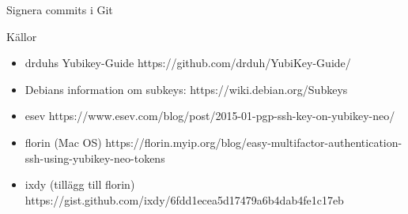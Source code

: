 \documentclass{beamer}
\begin{document}
\begin{frame}[fragile]{Signera commits i Git}
\end{frame}

\begin{frame}{Källor}
  \begin{itemize}
    \item drduhs Yubikey-Guide https://github.com/drduh/YubiKey-Guide/
    \item Debians information om subkeys: https://wiki.debian.org/Subkeys
    \item esev https://www.esev.com/blog/post/2015-01-pgp-ssh-key-on-yubikey-neo/
    \item florin (Mac OS) https://florin.myip.org/blog/easy-multifactor-authentication-ssh-using-yubikey-neo-tokens
    \item ixdy (tillägg till florin) https://gist.github.com/ixdy/6fdd1ecea5d17479a6b4dab4fe1c17eb
  \end{itemize}
\end{frame}

\end{document}
